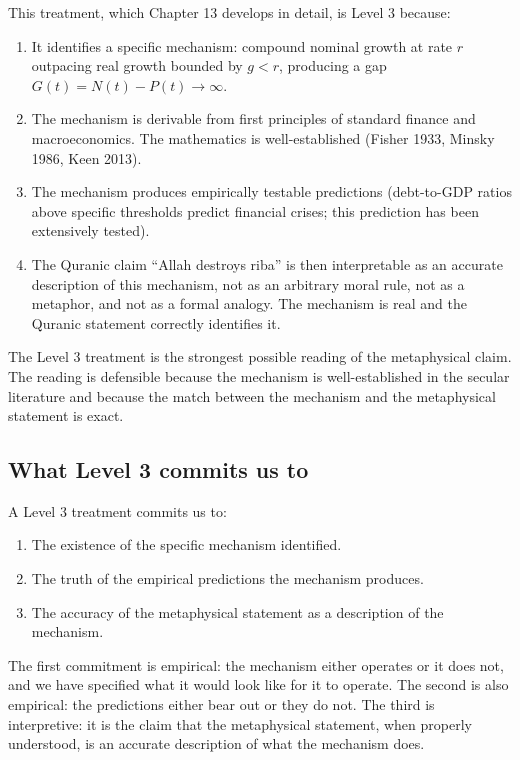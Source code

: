 This treatment, which Chapter 13 develops in detail, is Level 3
because:

\begin{enumerate}[leftmargin=2em]
    \item It identifies a specific mechanism: compound nominal
    growth at rate $r$ outpacing real growth bounded by $g < r$,
    producing a gap $G(t) = N(t) - P(t) \to \infty$.
    \item The mechanism is derivable from first principles of
    standard finance and macroeconomics. The mathematics is
    well-established (Fisher 1933, Minsky 1986, Keen 2013).
    \item The mechanism produces empirically testable predictions
    (debt-to-GDP ratios above specific thresholds predict financial
    crises; this prediction has been extensively tested).
    \item The Quranic claim ``Allah destroys riba'' is then
    interpretable as an accurate description of this mechanism, not
    as an arbitrary moral rule, not as a metaphor, and not as a
    formal analogy. The mechanism is real and the Quranic statement
    correctly identifies it.
\end{enumerate}

The Level 3 treatment is the strongest possible reading of the
metaphysical claim. The reading is defensible because the mechanism
is well-established in the secular literature and because the match
between the mechanism and the metaphysical statement is exact.

\subsection{What Level 3 commits us to}

A Level 3 treatment commits us to:

\begin{enumerate}[leftmargin=2em]
    \item The existence of the specific mechanism identified.
    \item The truth of the empirical predictions the mechanism
    produces.
    \item The accuracy of the metaphysical statement as a
    description of the mechanism.
\end{enumerate}

The first commitment is empirical: the mechanism either operates or
it does not, and we have specified what it would look like for it to
operate. The second is also empirical: the predictions either bear
out or they do not. The third is interpretive: it is the claim that
the metaphysical statement, when properly understood, is an accurate
description of what the mechanism does.

